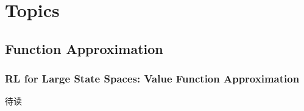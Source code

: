 \chapter{Topics}


\section{Function Approximation}

\subsection{RL for Large State Spaces: Value Function Approximation}


待读

